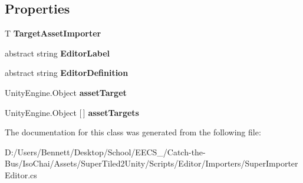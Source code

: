 \subsection*{Properties}
\begin{DoxyCompactItemize}
\item 
\mbox{\label{class_super_tiled2_unity_1_1_editor_1_1_super_importer_editor_a81649effa0821e42e143a67b8f38125a}} 
T {\bfseries Target\+Asset\+Importer}
\item 
\mbox{\label{class_super_tiled2_unity_1_1_editor_1_1_super_importer_editor_a0124b5d80f1452c83c396da697d3c77b}} 
abstract string {\bfseries Editor\+Label}
\item 
\mbox{\label{class_super_tiled2_unity_1_1_editor_1_1_super_importer_editor_a4f731087bd6b72d12290439c411d71e3}} 
abstract string {\bfseries Editor\+Definition}
\item 
\mbox{\label{class_super_tiled2_unity_1_1_editor_1_1_super_importer_editor_a4f6ceb1c9776c8fc23d79c05060cc348}} 
Unity\+Engine.\+Object {\bfseries asset\+Target}
\item 
\mbox{\label{class_super_tiled2_unity_1_1_editor_1_1_super_importer_editor_a10c2cca9fefcd5fa673f28dd4d084d81}} 
Unity\+Engine.\+Object \mbox{[}$\,$\mbox{]} {\bfseries asset\+Targets}
\end{DoxyCompactItemize}


The documentation for this class was generated from the following file\+:\begin{DoxyCompactItemize}
\item 
D\+:/\+Users/\+Bennett/\+Desktop/\+School/\+E\+E\+C\+S\+\_/\+Catch-\/the-\/\+Bus/\+Iso\+Chai/\+Assets/\+Super\+Tiled2\+Unity/\+Scripts/\+Editor/\+Importers/Super\+Importer\+Editor.\+cs\end{DoxyCompactItemize}
